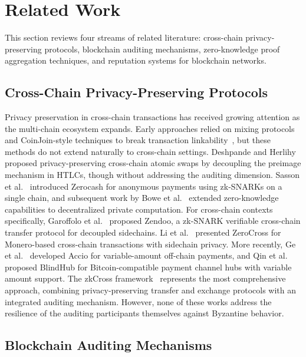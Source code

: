 \documentclass[journal]{IEEEtran}
\begin{document}
\section{Related Work}

This section reviews four streams of related literature: cross-chain privacy-preserving protocols, blockchain auditing mechanisms, zero-knowledge proof aggregation techniques, and reputation systems for blockchain networks.

\subsection{Cross-Chain Privacy-Preserving Protocols}

Privacy preservation in cross-chain transactions has received growing attention as the multi-chain ecosystem expands. Early approaches relied on mixing protocols and CoinJoin-style techniques to break transaction linkability~\cite{bonneau2014mixcoin, heilman2017tumblebit}, but these methods do not extend naturally to cross-chain settings. Deshpande and Herlihy~\cite{deshpande2020privacy} proposed privacy-preserving cross-chain atomic swaps by decoupling the preimage mechanism in HTLCs, though without addressing the auditing dimension. Sasson et al.~\cite{sasson2014zerocash} introduced Zerocash for anonymous payments using zk-SNARKs on a single chain, and subsequent work by Bowe et al.~\cite{bowe2020zexe} extended zero-knowledge capabilities to decentralized private computation. For cross-chain contexts specifically, Garoffolo et al.~\cite{garoffolo2020zendoo} proposed Zendoo, a zk-SNARK verifiable cross-chain transfer protocol for decoupled sidechains. Li et al.~\cite{li2022zerocross} presented ZeroCross for Monero-based cross-chain transactions with sidechain privacy. More recently, Ge et al.~\cite{ge2023accio} developed Accio for variable-amount off-chain payments, and Qin et al.~\cite{qin2023blindhub} proposed BlindHub for Bitcoin-compatible payment channel hubs with variable amount support. The zkCross framework~\cite{guo2024zkcross} represents the most comprehensive approach, combining privacy-preserving transfer and exchange protocols with an integrated auditing mechanism. However, none of these works address the resilience of the auditing participants themselves against Byzantine behavior.

\subsection{Blockchain Auditing Mechanisms}
\end{document}
